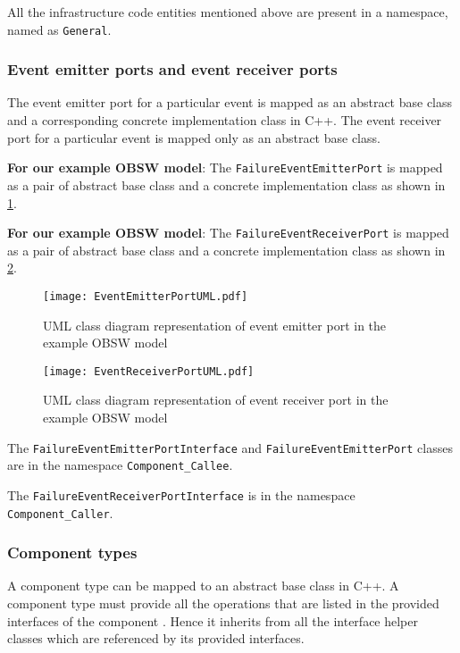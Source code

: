 All the infrastructure code entities mentioned above are present in a namespace, named as \texttt{General}.   

\subsubsection{\textbf{Event emitter ports and event receiver ports}}
The event emitter port for a particular event is mapped as an abstract base class and a corresponding concrete implementation class in C++. The event receiver port for a particular event is mapped only as an abstract base class.  

\textbf{For our example OBSW model}: The \texttt{FailureEvent\allowbreak EmitterPort} is mapped as a pair of abstract base class and a concrete implementation class as shown in \cref{fig: Event emitter port UML}.  

\textbf{For our example OBSW model}: The \texttt{FailureEvent\allowbreak ReceiverPort} is mapped as a pair of abstract base class and a concrete implementation class as shown in \cref{fig: Event receiver port UML}.

\begin{figure}[h]
	\centering
	\texttt{[image: EventEmitterPortUML.pdf]}
	\caption{UML class diagram representation of event emitter port in the example OBSW model}
	\label{fig: Event emitter port UML}
\end{figure}

\begin{figure}[h]
	\centering
	\texttt{[image: EventReceiverPortUML.pdf]}
	\caption{UML class diagram representation of event receiver port in the example OBSW model}
	\label{fig: Event receiver port UML}
\end{figure} 

The \texttt{FailureEvent\allowbreak Emitter\allowbreak Port\allowbreak Interface} and \texttt{FailureEvent\allowbreak Emitter\allowbreak Port} classes are in the namespace \texttt{Component\allowbreak \_Callee}. 

The \texttt{FailureEvent\allowbreak Receiver\allowbreak Port\allowbreak Interface} is in the namespace \texttt{Component\allowbreak\_Caller}.

\subsubsection{\textbf{Component types}}
A component type can be mapped to an abstract base class in C++. A component type must provide all the operations that are listed in the provided interfaces of the component \cite{CompBasedProcess}. Hence it inherits from all the interface helper classes which are referenced by its provided interfaces. 

